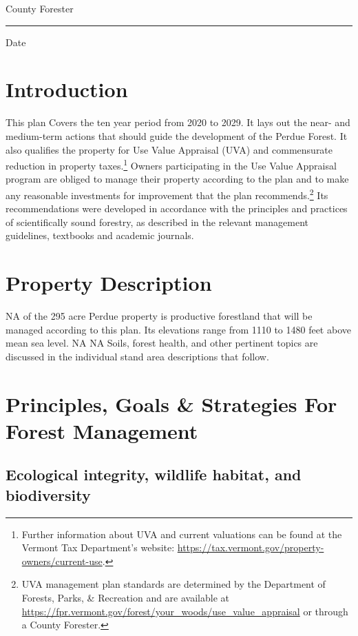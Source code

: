 \documentclass[]{tufte-handout}
\begin{document}
\noindent County Forester \rule{7cm}{0pt} Date

\pagebreak

\section{Introduction}\label{introduction}

This plan Covers the ten year period from 2020 to 2029. It lays out the
near- and medium-term actions that should guide the development of the
Perdue Forest. It also qualifies the property for Use Value Appraisal
(UVA) and commensurate reduction in property taxes.\footnote{Further
  information about UVA and current valuations can be found at the
  Vermont Tax Department's website:
  \url{https://tax.vermont.gov/property-owners/current-use}.
  \vspace{20pt}} Owners participating in the Use Value Appraisal program
are obliged to manage their property according to the plan and to make
any reasonable investments for improvement that the plan
recommends.\footnote{UVA management plan standards are determined by the
  Department of Forests, Parks, \& Recreation and are available at
  \url{https://fpr.vermont.gov/forest/your_woods/use_value_appraisal} or
  through a County Forester.} Its recommendations were developed in
accordance with the principles and practices of scientifically sound
forestry, as described in the relevant management guidelines, textbooks
and academic journals.

\section{Property Description}\label{property-description}

NA of the 295 acre Perdue property is productive forestland that will be
managed according to this plan. Its elevations range from 1110 to 1480
feet above mean sea level. NA NA Soils, forest health, and other
pertinent topics are discussed in the individual stand area descriptions
that follow.

\section{Principles, Goals \& Strategies For Forest
Management}\label{principles-goals-strategies-for-forest-management}

\subsection{Ecological integrity, wildlife habitat, and
biodiversity}\label{ecological-integrity-wildlife-habitat-and-biodiversity}
\end{document}
